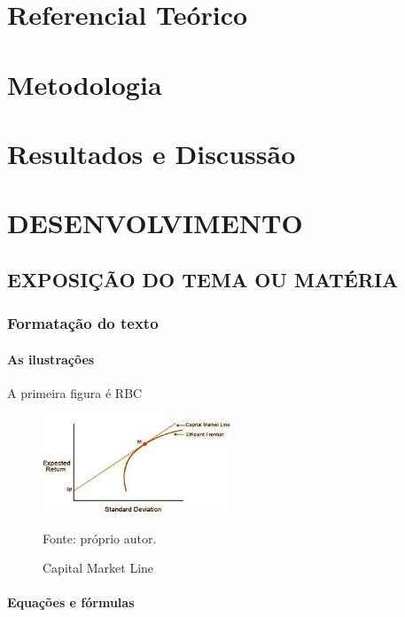 \section{Referencial Teórico}

\section{Metodologia}

\section{Resultados e Discussão}

\section{DESENVOLVIMENTO}
    \subsection{EXPOSIÇÃO DO TEMA OU MATÉRIA}
    \subsubsection{Formatação do texto}
    \paragraph{As ilustrações}

        \noindent A primeira figura é \acrfull{RBC}

        \begin{figure}[htp]
            \centering
            \caption{Capital Market Line}
            \includegraphics[width=0.5\textwidth]{./imagens/cml.jpg}
            \par \footnotesize Fonte: próprio autor.
            \label{fig:cml}
        \end{figure}


    \paragraph{Equações e fórmulas}
    
